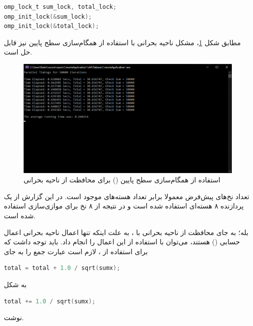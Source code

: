 \documentclass{HW}
\begin{document}
\begin{latin}
\begin{minipage}{\linewidth}
\begin{lstlisting}[language=C]
omp_lock_t sum_lock, total_lock;
omp_init_lock(&sum_lock);
omp_init_lock(&total_lock);
\end{lstlisting}
\end{minipage}
\end{latin}

مطابق شکل
\ref{fig:parallel-lock}،
مشکل ناحیه بحرانی با استفاده از همگام‌سازی سطح پایین نیز قابل حل است.

\begin{figure}[ht!]
\begin{center}
	\includegraphics[width=15cm]{images/parallel-lock}
\end{center}
\caption{استفاده از همگام‌سازی سطح پایین () برای محافظت از ناحیه بحرانی}
\label{fig:parallel-lock}
\end{figure}

\setcounter{mynumber}{1}
\begin{question}
تعداد نخ‌های پیش‌فرض  معمولا برابر تعداد هسته‌های موجود است. در این گزارش از یک پردازنده ۸ هسته‌ای استفاده شده است و در نتیجه از ۸ نخ برای موازی‌سازی استفاده شده است.
\end{question}

\begin{question}
بله؛ به جای محافظت از ناحیه بحرانی با ، به علت اینکه تنها اعمال ناحیه بحرانی اعمال حسابی () هستند، می‌توان با استفاده از  این اعمال را انجام داد. باید توجه داشت که برای استفاده از ، لازم است عبارت جمع را به جای
\begin{latin}
\begin{lstlisting}[language=C]
total = total + 1.0 / sqrt(sumx);
\end{lstlisting}
\end{latin}
به شکل
\begin{latin}
\begin{lstlisting}[language=C]
total += 1.0 / sqrt(sumx);
\end{lstlisting}
\end{latin}
نوشت.
\end{question}
\end{document}
